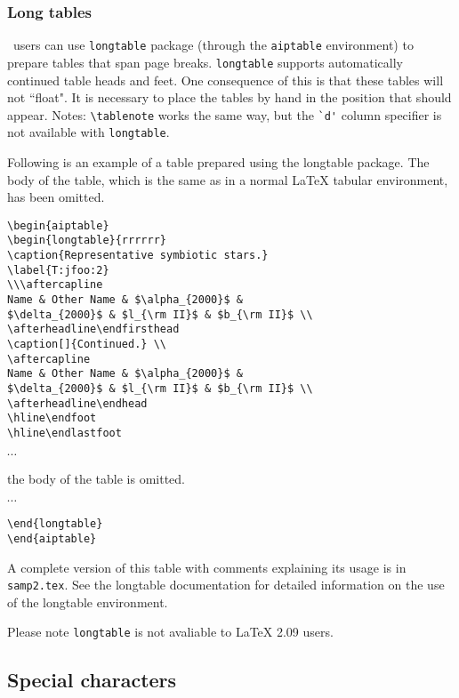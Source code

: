 \subsubsection{Long tables}
\latexe\ users can use \verb+longtable+ package (through the \verb+aiptable+
environment) to prepare tables that span page breaks.
\verb+longtable+ supports automatically continued table heads and feet.
One consequence of this is that these tables will not ``float". It is necessary
to place the tables by hand in the position that should appear. Notes:
\verb+\tablenote+ works the same way, but the \verb+`d'+ column specifier
is not available with \verb+longtable+.
 
Following is an example of a table prepared using the longtable package.
The body of the table, which is the same as in a normal LaTeX tabular
environment, has been omitted.
 
\begin{verbatim}
\begin{aiptable}
\begin{longtable}{rrrrrr}
\caption{Representative symbiotic stars.}
\label{T:jfoo:2}
\\\aftercapline
Name & Other Name & $\alpha_{2000}$ &
$\delta_{2000}$ & $l_{\rm II}$ & $b_{\rm II}$ \\
\afterheadline\endfirsthead
\caption[]{Continued.} \\
\aftercapline
Name & Other Name & $\alpha_{2000}$ &
$\delta_{2000}$ & $l_{\rm II}$ & $b_{\rm II}$ \\
\afterheadline\endhead
\hline\endfoot
\hline\endlastfoot
\end{verbatim}
\begin{center}
$\cdots$ \par
the body of the table is omitted.\par
$\cdots$ \par
\end{center}
\begin{verbatim}
\end{longtable}
\end{aiptable}
\end{verbatim}
\noindent
A complete version of this table with comments explaining its usage is in
\verb+samp2.tex+. See the longtable documentation for detailed
information on the use of the longtable environment.
 
Please note \verb+longtable+ is not avaliable to LaTeX 2.09 users.
 
\subsection{Special characters}

